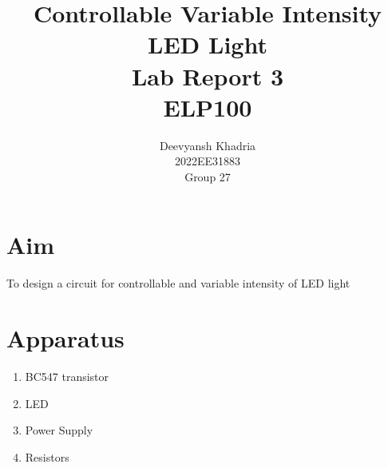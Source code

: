 \documentclass[12pt]{article}
\begin{document}
\title{Controllable Variable Intensity LED Light  \\ Lab Report 3 \\ ELP100}
\author{Deevyansh Khadria\\ 2022EE31883 \\ Group 27}
\maketitle

\vspace{15px}
\tableofcontents






\newpage
\section{Aim}
    To design a circuit for controllable and variable intensity of LED light 
\section{Apparatus}
    \begin{enumerate}
        \item BC547 transistor 
        \item LED 
        \item Power Supply 
        \item Resistors     
    \end{enumerate}
\end{document}
